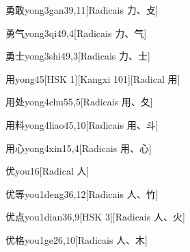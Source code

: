 \begin{entry}{勇敢}{yong3gan3}{9,11}[Radicais ⼒、⽁]
\end{entry}

\begin{entry}{勇气}{yong3qi4}{9,4}[Radicais ⼒、⽓]
\end{entry}

\begin{entry}{勇士}{yong3shi4}{9,3}[Radicais ⼒、⼠]
\end{entry}

\begin{entry}{用}{yong4}{5}[HSK 1][Kangxi 101][Radical ⽤]
\end{entry}

\begin{entry}{用处}{yong4chu5}{5,5}[Radicais ⽤、⼡]
\end{entry}

\begin{entry}{用料}{yong4liao4}{5,10}[Radicais ⽤、⽃]
\end{entry}

\begin{entry}{用心}{yong4xin1}{5,4}[Radicais ⽤、⼼]
\end{entry}

\begin{entry}{优}{you1}{6}[Radical ⼈]
\end{entry}

\begin{entry}{优等}{you1deng3}{6,12}[Radicais ⼈、⽵]
\end{entry}

\begin{entry}{优点}{you1dian3}{6,9}[HSK 3][Radicais ⼈、⽕]
\end{entry}

\begin{entry}{优格}{you1ge2}{6,10}[Radicais ⼈、⽊]
\end{entry}

